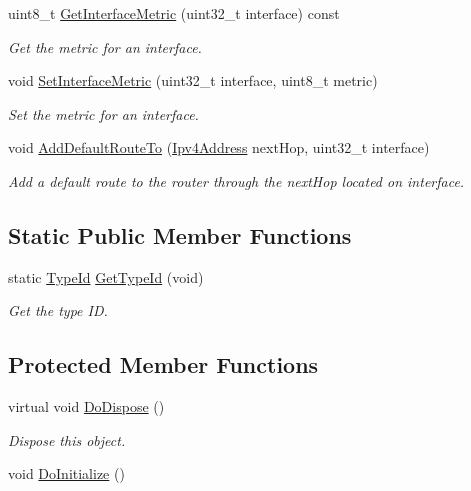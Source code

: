 \begin{DoxyCompactItemize}
uint8\+\_\+t \hyperlink{classns3_1_1Rip_a6bff4d6e94d4ca9e3f276df0fb538b8f}{Get\+Interface\+Metric} (uint32\+\_\+t interface) const 
\begin{DoxyCompactList}\small\item\em Get the metric for an interface. \end{DoxyCompactList}\item 
void \hyperlink{classns3_1_1Rip_a068a04a9653f7b9295350aba52dc58a0}{Set\+Interface\+Metric} (uint32\+\_\+t interface, uint8\+\_\+t metric)
\begin{DoxyCompactList}\small\item\em Set the metric for an interface. \end{DoxyCompactList}\item 
void \hyperlink{classns3_1_1Rip_ae57b91bb372f7ab60d5519f32750af95}{Add\+Default\+Route\+To} (\hyperlink{classns3_1_1Ipv4Address}{Ipv4\+Address} next\+Hop, uint32\+\_\+t interface)
\begin{DoxyCompactList}\small\item\em Add a default route to the router through the next\+Hop located on interface. \end{DoxyCompactList}\end{DoxyCompactItemize}
\subsection*{Static Public Member Functions}
\begin{DoxyCompactItemize}
\item 
static \hyperlink{classns3_1_1TypeId}{Type\+Id} \hyperlink{classns3_1_1Rip_ace3389e07c4181ca5bc9c2ca5a4bab24}{Get\+Type\+Id} (void)
\begin{DoxyCompactList}\small\item\em Get the type ID. \end{DoxyCompactList}\end{DoxyCompactItemize}
\subsection*{Protected Member Functions}
\begin{DoxyCompactItemize}
\item 
virtual void \hyperlink{classns3_1_1Rip_a4b7ea6fdc9d480f3ed80c3daeb946818}{Do\+Dispose} ()
\begin{DoxyCompactList}\small\item\em Dispose this object. \end{DoxyCompactList}\item 
void \hyperlink{classns3_1_1Rip_a622ec450ec78945f81986b64ce3dcbed}{Do\+Initialize} ()
\end{DoxyCompactItemize}
